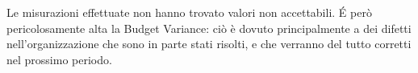 Le misurazioni effettuate non hanno trovato valori non accettabili.\newline
\'E però pericolosamente alta la Budget Variance: ciò è dovuto principalmente a dei difetti nell'organizzazione che sono in parte stati risolti, e che verranno del tutto corretti nel prossimo periodo.